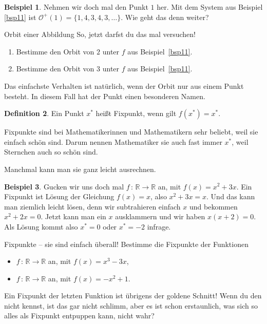 \documentclass[a4paper,ngerman,12pt]{zirkelblatt1415}
\theoremstyle{definition}
\newtheorem{definition}{Definition}
\newtheorem{beispiel}[definition]{Beispiel}
\theoremstyle{remark}
\begin{document}
\begin{beispiel}
Nehmen wir doch mal den Punkt $1$ her.
Mit dem System aus Beispiel \ref{bsp11} ist $\mathcal{O}^+(1) = \{1,4,3,4,3,\ldots\}$.
Wie geht das denn weiter?
\end{beispiel}



\begin{aufgabe}{Orbit einer Abbildung}
  So, jetzt darfst du das mal versuchen! 
  \begin{enumerate}
    \item Bestimme den Orbit von $2$ unter $f$ aus Beispiel~\ref{bsp11}.
    \item Bestimme den Orbit von $3$ unter $f$ aus Beispiel~\ref{bsp11}.
  \end{enumerate}
\end{aufgabe}


Das einfachste Verhalten ist natürlich, wenn der Orbit nur aus einem Punkt besteht.
In diesem Fall hat der Punkt einen besonderen Namen.
\begin{definition}
Ein Punkt $x^{*}$ heißt Fixpunkt, wenn gilt $f(x^{*}) =x^{*}$.
\end{definition}

Fixpunkte sind bei Mathematikerinnen und Mathematikern sehr beliebt, weil sie einfach schön sind.
Darum nennen Mathematiker sie auch fast immer $x^{*}$, weil Sternchen auch so schön sind.

Manchmal kann man sie ganz leicht ausrechnen.
\begin{beispiel}
  Gucken wir uns doch mal $f \, : \, \mathbb{R} \to \mathbb{R}$ an, mit $f(x) = x^2 + 3x$.
  Ein Fixpunkt ist Lösung der Gleichung $f(x) = x$, also $x^2 + 3x = x$.
  Und das kann man ziemlich leicht lösen, denn wir subtrahieren einfach $x$ und bekommen $x^2 + 2x = 0$.
  Jetzt kann man ein $x$ ausklammern und wir haben $x (x + 2) = 0$. Als Lösung kommt also $x^{*} = 0$ oder 
  $x^{*} = -2$ infrage. 
\end{beispiel}

\begin{aufgabe}{Fixpunkte -- sie sind einfach überall!}
  Bestimme die Fixpunkte der Funktionen 
  \begin{itemize}
   \item $f \, : \, \mathbb{R} \to \mathbb{R}$ an, mit $f(x) =  x^3 - 3x$,
   \item $f \, : \, \mathbb{R} \to \mathbb{R}$ an, mit $f(x) = -x^2 + 1$.
  \end{itemize}
  Ein Fixpunkt der letzten Funktion ist übrigens der goldene Schnitt! 
  Wenn du den nicht kennst, ist das gar nicht schlimm, aber es ist schon erstaunlich, was sich so alles als Fixpunkt entpuppen kann, nicht wahr?
\end{aufgabe}
\end{document}
